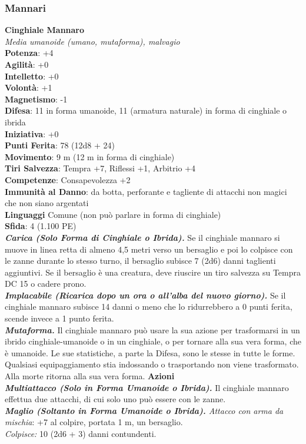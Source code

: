 \begin{multicols}{2}
\subsubsection{Mannari}

\medskip\textbf{Cinghiale Mannaro}\\
\emph{Media umanoide (umano, mutaforma), malvagio} \\
\textbf{Potenza}: +4\\
\textbf{Agilità}: +0\\
\textbf{Intelletto}: +0\\
\textbf{Volontà}: +1\\
\textbf{Magnetismo}: -1\\
\textbf{Difesa}: 11 in forma umanoide, 11 (armatura naturale) in forma di cinghiale o ibrida\\ \textbf{Iniziativa}: +0\\
\textbf{Punti Ferita}: 78 (12d8 + 24)\\
\textbf{Movimento}: 9 m (12 m in forma di cinghiale)\\
\textbf{Tiri Salvezza}: Tempra +7, Riflessi +1, Arbitrio +4\\
\textbf{Competenze}: Consapevolezza +2\\
\textbf{Immunità al Danno}: da botta, perforante e tagliente di attacchi non magici che non siano argentati\\
\textbf{Linguaggi} Comune (non può parlare in forma di cinghiale)\\
\textbf{Sfida}: 4 (1.100 PE)\smallskip\\
\emph{\textbf{Carica (Solo Forma di Cinghiale o Ibrida).}} Se il cinghiale mannaro si muove in linea retta di almeno 4,5 metri verso un bersaglio e poi lo colpisce con le zanne durante lo stesso turno, il bersaglio subisce 7 (2d6) danni taglienti aggiuntivi. Se il bersaglio è una creatura, deve riuscire un tiro salvezza su Tempra DC  15 o cadere prono.\\
\emph{\textbf{Implacabile (Ricarica dopo un ora o all'alba del nuovo giorno).}} Se il cinghiale mannaro subisce 14 danni o meno che lo ridurrebbero a 0 punti ferita, scende invece a 1 punto ferita.\\
\emph{\textbf{Mutaforma.}} Il cinghiale mannaro può usare la sua azione per trasformarsi in un ibrido cinghiale-umanoide o in un cinghiale, o per tornare alla sua vera forma, che è umanoide. Le sue statistiche, a parte la Difesa, sono le stesse in tutte le forme. Qualsiasi equipaggiamento stia indossando o trasportando non viene trasformato. Alla morte ritorna alla sua vera forma.
\smallskip\textbf{Azioni}\\
\emph{\textbf{Multiattacco (Solo in Forma Umanoide o Ibrida).}} Il cinghiale mannaro effettua due attacchi, di cui solo uno può essere con le zanne.\\
\emph{\textbf{Maglio (Soltanto in Forma Umanoide o Ibrida).} Attacco con arma da mischia}: +7 al colpire, portata 1 m, un bersaglio. \\
\emph{Colpisce:} 10 (2d6 + 3) danni contundenti.\\


\end{multicols}
